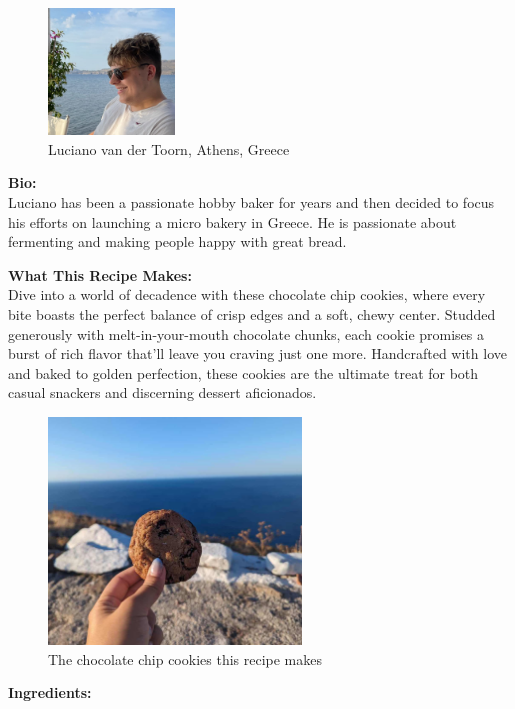 \begin{figure}[h]
    \centering
    \includegraphics[width=0.3\textwidth]{chocolate-chip-cookies-author}
    \caption{Luciano van der Toorn, Athens, Greece}
\end{figure}

\noindent\textbf{Bio:}\\
Luciano has been a passionate hobby baker for years
and then decided to focus his efforts on launching
a micro bakery in Greece. He is passionate about
fermenting and making people happy with great bread.

\noindent\textbf{What This Recipe Makes:}\\
Dive into a world of decadence with these chocolate chip cookies,
where every bite boasts the perfect balance of crisp edges and a soft,
chewy center. Studded generously with melt-in-your-mouth chocolate chunks,
each cookie promises a burst of rich flavor that'll leave you craving just one more.
Handcrafted with love and baked to golden perfection,
these cookies are the ultimate treat for both casual snackers and discerning dessert aficionados.

\begin{figure}[h]
    \centering
    \includegraphics[width=0.6\textwidth]{chocolate-chip-cookies.jpg}
    \caption{The chocolate chip cookies this recipe makes}
\end{figure}

\noindent\textbf{Ingredients:}

